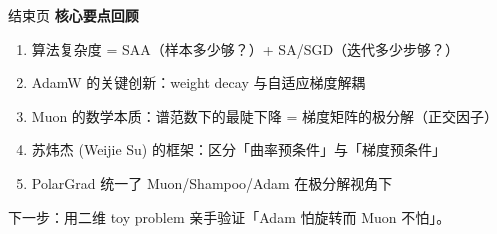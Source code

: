 \documentclass[aspectratio=169,10pt]{ctexbeamer}
\begin{document}
\begin{frame}{结束页}
\centering
\Large
\textbf{核心要点回顾}

\vspace{0.3cm}
\normalsize
\begin{enumerate}
  \item 算法复杂度 = SAA（样本多少够？）+ SA/SGD（迭代多少步够？）
  \item AdamW 的关键创新：weight decay 与自适应梯度解耦
  \item Muon 的数学本质：谱范数下的最陡下降 = 梯度矩阵的极分解（正交因子）
  \item 苏炜杰 (Weijie Su) 的框架：区分「曲率预条件」与「梯度预条件」
  \item PolarGrad 统一了 Muon/Shampoo/Adam 在极分解视角下
\end{enumerate}

\vspace{0.4cm}
下一步：用二维 toy problem 亲手验证「Adam 怕旋转而 Muon 不怕」。
\end{frame}
\end{document}
